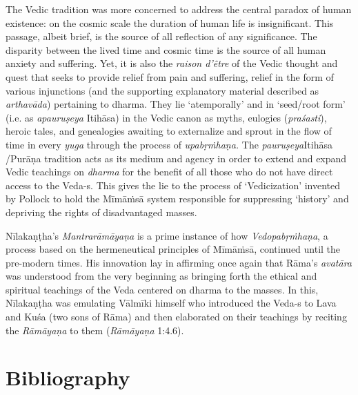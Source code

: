 The Vedic tradition was more concerned to address the central paradox of human existence: on the cosmic scale the duration of human life is insignificant. This passage, albeit brief, is the source of all reflection of any significance. The disparity between the lived time and cosmic time is the source of all human anxiety and suffering. Yet, it is also the \textit{raison d'être} of the Vedic thought and quest that seeks to provide relief from pain and suffering, relief in the form of various injunctions (and the supporting explanatory material described as \textit{arthavāda}) pertaining to dharma. They lie ‘atemporally’ and in ‘seed/root form’ (i.e. as \textit{apauruṣeya }Itihāsa) in the Vedic canon as myths, eulogies (\textit{praśasti}), heroic tales, and genealogies awaiting to externalize and sprout in the flow of time in every \textit{yuga} through the process of \textit{upabṛṁhaṇa.} The \textit{pauruṣeya}Itihāsa /Purāṇa tradition acts as its medium and agency in order to extend and expand Vedic teachings on \textit{dharma} for the benefit of all those who do not have direct access to the Veda-s. This gives the lie to the process of ‘Vedicization’ invented by Pollock to hold the Mīmāṁsā system responsible for suppressing ‘history’ and depriving the rights of disadvantaged masses.

Nīlakaṇṭha's \textit{Mantrarāmāyaṇa} is a prime instance of how \textit{Vedopabṛṁ\-haṇa}, a process based on the hermeneutical principles of Mīmāṁsā, continued until the pre-modern times. His innovation lay in affirming once again that Rāma's \textit{avatāra} was understood from the very beginning as bringing forth the ethical and spiritual teachings of the Veda centered on dharma to the masses. In this, Nīlakaṇṭha was emulating Vālmīki himself who introduced the Veda-s to Lava and Kuśa (two sons of Rāma) and then elaborated on their teachings by reciting the \textit{Rāmāyaṇa} to them (\textit{Rāmāyaṇa} 1:4.6).


\section*{Bibliography}

